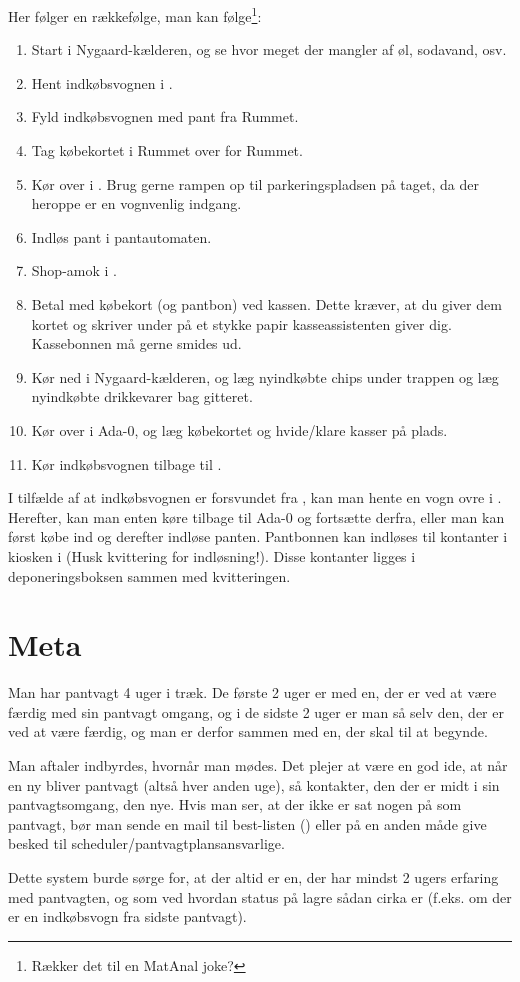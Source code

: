 Her følger en rækkefølge, man kan følge\footnote{Rækker det til en MatAnal joke?}:

\begin{enumerate}
\item Start i Nygaard-kælderen, og se hvor meget der mangler af øl,
  sodavand, osv.
\item Hent indkøbsvognen i \shoppingcartloc.
\item Fyld indkøbsvognen med pant fra Rummet.
\item Tag købekortet i Rummet over for Rummet.
\item Kør over i \fotex. Brug gerne rampen op til parkeringspladsen på
  taget, da der heroppe er en vognvenlig indgang.
\item Indløs pant i pantautomaten.
\item Shop-amok i \fotex.
\item Betal med købekort (og pantbon) ved kassen. Dette kræver, at du
  giver dem kortet og skriver under på et stykke papir
  kasseassistenten giver dig. Kassebonnen må gerne smides ud.
\item Kør ned i Nygaard-kælderen, og læg nyindkøbte chips under
  trappen og læg nyindkøbte drikkevarer bag gitteret.
\item Kør over i Ada-0, og læg købekortet og hvide/klare kasser på
  plads.
\item Kør indkøbsvognen tilbage til \shoppingcartloc.
\end{enumerate}

I tilfælde af at indkøbsvognen er forsvundet fra \shoppingcartloc, kan man hente en vogn ovre i \fotex. Herefter, kan man
enten køre tilbage til Ada-0 og fortsætte derfra, eller man kan først
købe ind og derefter indløse panten. Pantbonnen kan indløses til
kontanter i kiosken i \fotex (Husk kvittering for indløsning!). Disse
kontanter ligges i deponeringsboksen sammen med kvitteringen.

\section{Meta}
\label{sec:meta}

Man har pantvagt 4 uger i træk. De første 2 uger er med en, der er ved
at være færdig med sin pantvagt omgang, og i de sidste 2 uger er man
så selv den, der er ved at være færdig, og man er derfor sammen med
en, der skal til at begynde.

Man aftaler indbyrdes, hvornår man mødes. Det plejer at være en god
ide, at når en ny bliver pantvagt (altså hver anden uge), så
kontakter, den der er midt i sin pantvagtsomgang, den nye. Hvis man
ser, at der ikke er sat nogen på som pantvagt, bør man sende en mail
til best-listen () eller på en anden måde
give besked til scheduler/pantvagtplansansvarlige.

Dette system burde sørge for, at der altid er en, der har mindst 2
ugers erfaring med pantvagten, og som ved hvordan status på lagre
sådan cirka er (f.eks. om der er en indkøbsvogn fra sidste pantvagt).




